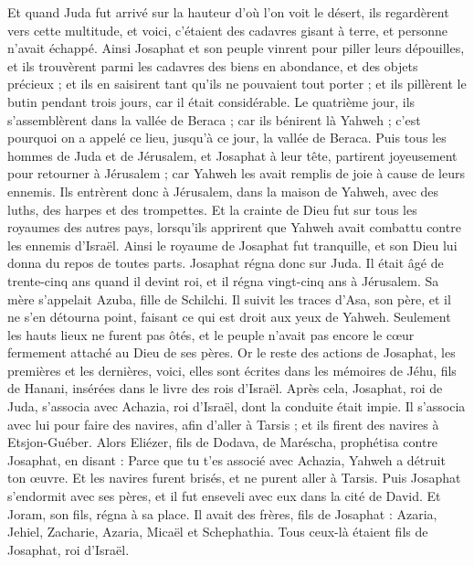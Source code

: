 \begin{multicols}{2}
Et quand Juda fut arrivé sur la hauteur d'où l'on voit le désert, ils regardèrent vers cette multitude, et voici, c'étaient des cadavres gisant à terre, et personne n'avait échappé.
Ainsi Josaphat et son peuple vinrent pour piller leurs dépouilles, et ils trouvèrent parmi les cadavres des biens en abondance, et des objets précieux ; et ils en saisirent tant qu'ils ne pouvaient tout porter ; et ils pillèrent le butin pendant trois jours, car il était considérable.
Le quatrième jour, ils s'assemblèrent dans la vallée de Beraca ; car ils bénirent là Yahweh ; c'est pourquoi on a appelé ce lieu, jusqu'à ce jour, la vallée de Beraca.
Puis tous les hommes de Juda et de Jérusalem, et Josaphat à leur tête, partirent joyeusement pour retourner à Jérusalem ; car Yahweh les avait remplis de joie à cause de leurs ennemis.
Ils entrèrent donc à Jérusalem, dans la maison de Yahweh, avec des luths, des harpes et des trompettes.
Et la crainte de Dieu fut sur tous les royaumes des autres pays, lorsqu'ils apprirent que Yahweh avait combattu contre les ennemis d'Israël.
Ainsi le royaume de Josaphat fut tranquille, et son Dieu lui donna du repos de toutes parts.
Josaphat régna donc sur Juda. Il était âgé de trente-cinq ans quand il devint roi, et il régna vingt-cinq ans à Jérusalem. Sa mère s'appelait Azuba, fille de Schilchi.
Il suivit les traces d'Asa, son père, et il ne s'en détourna point, faisant ce qui est droit aux yeux de Yahweh.
Seulement les hauts lieux ne furent pas  ôtés, et le peuple n'avait pas encore le cœur fermement attaché au Dieu de ses pères.
Or le reste des actions de Josaphat, les premières et les dernières, voici, elles sont écrites dans les mémoires de Jéhu, fils de Hanani, insérées dans le livre des rois d'Israël.
Après cela, Josaphat, roi de Juda, s'associa avec Achazia, roi d'Israël, dont la conduite était impie.
Il s'associa avec lui pour faire des navires, afin d'aller à Tarsis ; et ils firent des navires à Etsjon-Guéber.
Alors Eliézer, fils de Dodava, de Maréscha, prophétisa contre Josaphat, en disant : Parce que tu t'es associé avec Achazia, Yahweh a détruit ton œuvre. Et les navires furent brisés, et ne purent aller à Tarsis.
\VerseOne{}Puis Josaphat s'endormit avec ses pères, et il fut enseveli avec eux dans la cité de David. Et Joram, son fils, régna à sa place.
Il avait des frères, fils de Josaphat : Azaria, Jehiel, Zacharie, Azaria, Micaël et Schephathia. Tous ceux-là étaient fils de Josaphat, roi d'Israël.

\end{multicols}
